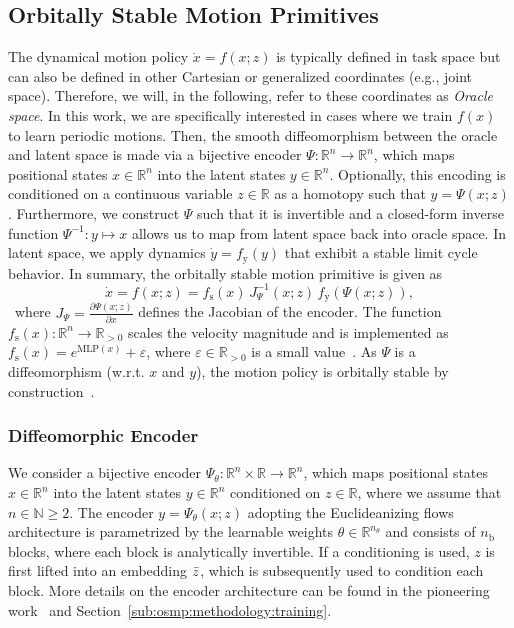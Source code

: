 \subsection{Orbitally Stable Motion Primitives}
The dynamical motion policy $\dot{x}=f(x; z)$ is typically defined in task space but can also be defined in other Cartesian or generalized coordinates (e.g., joint space). Therefore, we will, in the following, refer to these coordinates as \emph{Oracle space}.
In this work, we are specifically interested in cases where we train $f(x)$ to learn periodic motions.
Then, the smooth diffeomorphism between the oracle and latent space is made via a bijective encoder $\Psi: \mathbb{R}^n \to \mathbb{R}^n$, which maps positional states $x \in \mathbb{R}^n$ into the latent states $y \in \mathbb{R}^n$.
Optionally, this encoding is conditioned on a continuous variable $z \in \mathbb{R}$ as a homotopy such that $y = \Psi(x;z)$.
Furthermore, we construct $\Psi$ such that it is invertible and a closed-form inverse function $\Psi^{-1}: y \mapsto x$ allows us to map from latent space back into oracle space.
In latent space, we apply dynamics $\dot{y} = f_\mathrm{y}(y)$ that exhibit a stable limit cycle behavior. In summary, the orbitally stable motion primitive is given as
\begin{equation}\label{eq:dynamics}
    \dot{x} = f(x;z) = f_\mathrm{s}(x) \, J_\Psi^{-1}(x;z) \, f_\mathrm{y} \left (\Psi(x;z) \right ),
\end{equation}\
where $J_\Psi = \frac{\partial \Psi(x;z)}{\partial x}$ defines the Jacobian of the encoder. 
The function $f_\mathrm{s}(x): \mathbb{R}^n \to \mathbb{R}_{>0}$ scales the velocity magnitude and is implemented as $f_\mathrm{s}(x) = e^{\mathrm{MLP}(x)} + \varepsilon$, where $\varepsilon \in \mathbb{R}_{>0}$ is a small value~\citep{rana2020euclideanizing}.
As $\Psi$ is a diffeomorphism (w.r.t. $x$ and $y$), the motion policy is orbitally stable by construction~\citep{rana2020euclideanizing, zhi2024teaching}.

\subsubsection{Diffeomorphic Encoder}
We consider a bijective encoder $\Psi_\theta : \mathbb{R}^n \times \mathbb{R} \to \mathbb{R}^n$, which maps positional states $x \in \mathbb{R}^n$ into the latent states $y \in \mathbb{R}^n$ conditioned on $z \in \mathbb{R}$, where we assume that $n \in \mathbb{N} \geq 2$.
The encoder $y = \Psi_\theta(x;z)$ adopting the Euclideanizing flows~\citep{dinh2017density, rana2020euclideanizing} architecture is parametrized by the learnable weights $\theta \in \mathbb{R}^{n_\theta}$ and consists of $n_\mathrm{b}$ blocks, where each block is analytically invertible.
If a conditioning is used, $z$ is first lifted into an embedding $\Bar{z}$, which is subsequently used to condition each block.
More details on the encoder architecture can be found in the pioneering work~\citep{dinh2017density, rana2020euclideanizing} and Section~\ref{sub:osmp:methodology:training}.

